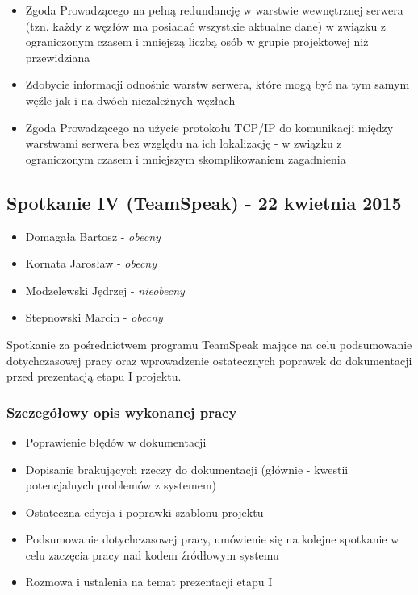 \begin{itemize}
\item Zgoda Prowadzącego na pełną redundancję w warstwie wewnętrznej serwera (tzn. każdy z węzłów ma posiadać wszystkie aktualne dane) w związku z ograniczonym czasem i mniejszą liczbą osób w grupie projektowej niż przewidziana
\item Zdobycie informacji odnośnie warstw serwera, które mogą być na tym samym węźle jak i na dwóch niezależnych węzłach
\item Zgoda Prowadzącego na użycie protokołu TCP/IP do komunikacji między warstwami serwera bez względu na ich lokalizację - w związku z ograniczonym czasem i mniejszym skomplikowaniem zagadnienia
\end{itemize}

\subsection[Spotkanie IV - 22 kwietnia 2015]{Spotkanie IV (TeamSpeak) - 22 kwietnia 2015}

\begin{itemize}
\item Domagała Bartosz - \textit{obecny}
\item Kornata Jarosław - \textit{obecny}
\item Modzelewski Jędrzej - \textit{nieobecny}
\item Stepnowski Marcin - \textit{obecny}
\end{itemize}

\par{Spotkanie za pośrednictwem programu TeamSpeak mające na celu podsumowanie dotychczasowej pracy oraz wprowadzenie ostatecznych poprawek do dokumentacji przed prezentacją etapu I projektu.}

\subsubsection*[Szczegółowy opis wykonanej pracy]{Szczegółowy opis wykonanej pracy}
\begin{itemize}
\item Poprawienie błędów w dokumentacji
\item Dopisanie brakujących rzeczy do dokumentacji (głównie - kwestii potencjalnych problemów z systemem)
\item Ostateczna edycja i poprawki szablonu projektu
\item Podsumowanie dotychczasowej pracy, umówienie się na kolejne spotkanie w celu zaczęcia pracy nad kodem źródłowym systemu
\item Rozmowa i ustalenia na temat prezentacji etapu I
\end{itemize}

